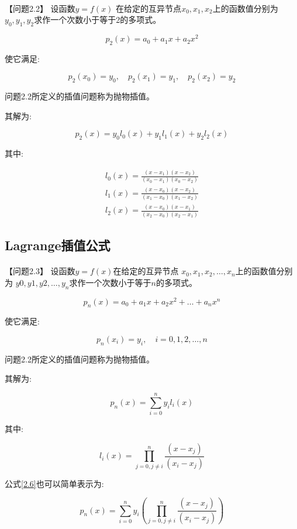 \documentclass[12pt]{report}
\begin{document}
\paragraph{ } 【问题2.2】 \quad 设函数$y=f(x)$
在给定的互异节点$x_0,x_1,x_2$上的函数值分别为$y_0,y_1,y_2$求作一个次数小于等于2的多项式。

\[p_2(x) = a_0 + a_1x + a_2x^2\]

使它满足:

\[p_2(x_0)=y_0, \quad p_2(x_1)=y_1, \quad p_2(x_2)=y_2\]

问题2.2所定义的插值问题称为抛物插值。

其解为:

\[ p_2(x) = y_0l_0(x) + y_1l_1(x) + y_2l_2(x) \tag{2.5} \label{2.5} \]

其中:

\begin{align*}
	l_0(x)=\frac{(x-x_1)(x-x_2)}{(x_0-x_1)(x_0-x_2)} \\
	l_1(x)=\frac{(x-x_0)(x-x_2)}{(x_1-x_0)(x_1-x_2)} \\
	l_2(x)=\frac{(x-x_0)(x-x_1)}{(x_2-x_0)(x_2-x_1)}
\end{align*}

\subsection{Lagrange插值公式}

\paragraph{ } 【问题2.3】 \quad 设函数$y=f(x)$在给定的互异节点
\( x_0, x_1, x_2,\ldots,x_n \)上的函数值分别为
\( y0,y1,y2,\ldots,y_n \)求作一个次数小于等于$n$的多项式。

\[p_n(x) = a_0 + a_1x + a_2x^2 + \ldots + a_nx^n\]

使它满足:

\[ p_n(x_i)=y_i, \quad i=0,1,2,\ldots,n \]

问题2.2所定义的插值问题称为抛物插值。

其解为:

\[ p_n(x) = \sum_{i=0}^ny_il_i(x)\tag{2.6} \label{2.6} \]

其中:

\[ l_i(x) = \prod_{j=0, j\not=i}^n \frac{(x-x_j)}{(x_i-x_j)} \]

公式\eqref{2.6}也可以简单表示为:

\[
	p_n(x) = \sum_{i=0}^ny_i \left(
	\prod_{j=0, j\not=i}^n
	\frac{(x-x_j)}{(x_i-x_j)}
	\right) \tag{2.7} \label{2.7}
\]
\end{document}
